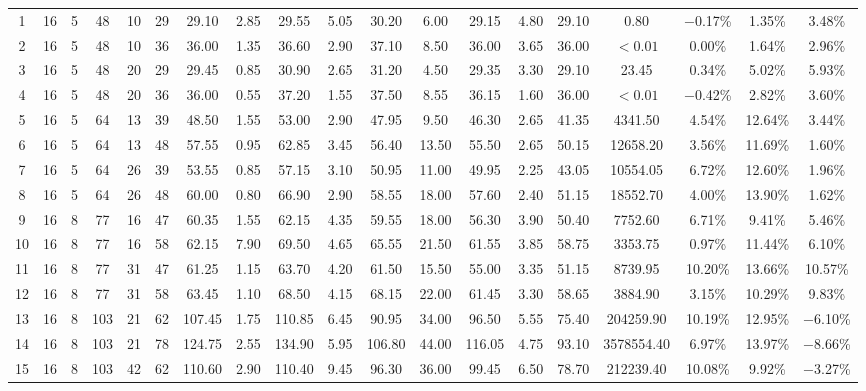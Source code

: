 \documentclass[review,3p,times,12pt,number]{elsarticle}\usepackage{amsmath}\usepackage{amssymb}
\begin{document}
\begin{landscape}
\begin{table}[htbp]
\begin{tabular}{ccccccccccccccccccc}
1 & 16 & 5 & 48  & 10 & 29 & 29.10  & 2.85 & 29.55  & 5.05  & 30.20 & 6.00  & 29.15 & 4.80   & 29.10 & 0.80      &$-$0.17\% &1.35\%   & 3.48\%\\
2 & 16 & 5 & 48  & 10 & 36 & 36.00  & 1.35 & 36.60  & 2.90  & 37.10 & 8.50  & 36.00 & 3.65   & 36.00 & $<0.01$   &0.00\%       &1.64\%   & 2.96\%\\
3 & 16 & 5 & 48  & 20 & 29 & 29.45  & 0.85 & 30.90  & 2.65  & 31.20 & 4.50  & 29.35 & 3.30   & 29.10 & 23.45     &0.34\%  &5.02\%   & 5.93\%\\
4 & 16 & 5 & 48  & 20 & 36 & 36.00  & 0.55 & 37.20  & 1.55  & 37.50 & 8.55  & 36.15 & 1.60   & 36.00 & $<0.01$   &$-$0.42\% &2.82\%   & 3.60\%\\
5 & 16 & 5 & 64  & 13 & 39 & 48.50  & 1.55 & 53.00  & 2.90  & 47.95 & 9.50  & 46.30 & 2.65   & 41.35 & 4341.50   &4.54\%  &12.64\%  & 3.44\%\\
6 & 16 & 5 & 64  & 13 & 48 & 57.55  & 0.95 & 62.85  & 3.45  & 56.40 & 13.50 & 55.50 & 2.65   & 50.15 & 12658.20  &3.56\%  & 11.69\% & 1.60\%\\
7 & 16 & 5 & 64  & 26 & 39 & 53.55  & 0.85 & 57.15  & 3.10  & 50.95 & 11.00 &49.95  & 2.25   & 43.05 & 10554.05  &6.72\%  & 12.60\%  & 1.96\%\\
8 & 16 & 5 & 64  & 26 & 48 & 60.00  & 0.80 & 66.90  & 2.90  & 58.55 & 18.00 &57.60  & 2.40   & 51.15 & 18552.70  &4.00\%     & 13.90\%  & 1.62\%\\
9 & 16 & 8 & 77  & 16 & 47 & 60.35  & 1.55 & 62.15  & 4.35  & 59.55 & 18.00 &56.30  & 3.90   & 50.40 & 7752.60   &6.71\%  & 9.41\%  & 5.46\%\\
10& 16 & 8 & 77  & 16 & 58 & 62.15  & 7.90 & 69.50  & 4.65  & 65.55 & 21.50 &61.55  & 3.85   & 58.75 & 3353.75   &0.97\%  &11.44\%  & 6.10\%\\
11& 16 & 8 & 77  & 31 & 47 & 61.25  & 1.15 & 63.70  & 4.20  & 61.50 & 15.50 &55.00  & 3.35   & 51.15 & 8739.95   &10.20\%  & 13.66\% & 10.57\%\\
12& 16 & 8 & 77  & 31 & 58 & 63.45  & 1.10 & 68.50  & 4.15  & 68.15 & 22.00 &61.45  & 3.30   & 58.65 & 3884.90   &3.15\%  & 10.29\% & 9.83\%\\
13& 16 & 8 & 103 & 21 & 62 & 107.45 & 1.75 & 110.85 & 6.45  & 90.95 & 34.00 &96.50  & 5.55   & 75.40 & 204259.90 &10.19\% & 12.95\% & $-$6.10\%\\
14& 16 & 8 & 103 & 21 & 78 & 124.75 & 2.55 & 134.90 & 5.95  & 106.80& 44.00 &116.05 & 4.75   & 93.10 & 3578554.40&6.97\%  & 13.97\% & $-$8.66\%\\
15& 16 & 8 & 103 & 42 & 62 & 110.60 & 2.90 & 110.40 & 9.45  & 96.30 & 36.00 &99.45  & 6.50   & 78.70 & 212239.40 &10.08\% & 9.92\%  & $-$3.27\%\\

\end{tabular}
\end{table}
\end{landscape}
\end{document}
